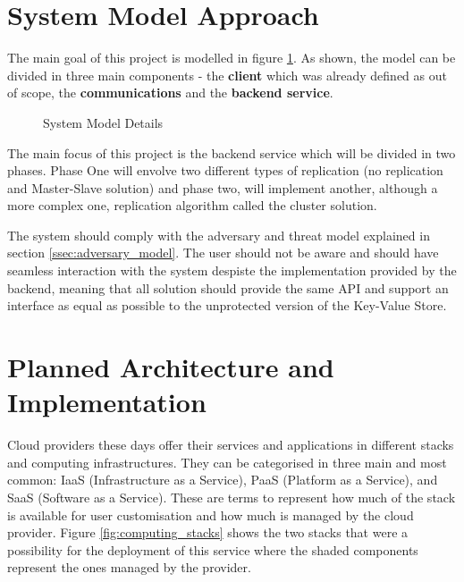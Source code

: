 \section{System Model Approach} %
\label{sec:system_model_approach}

The main goal of this project is modelled in figure \ref{fig:syste_model_detailed}. As shown, the model can be divided in three main components - the \textbf{client} which was already defined as out of scope, the \textbf{communications} and the \textbf{backend service}. 

\begin{figure}[htbp]
  \caption{System Model Details}
  \label{fig:syste_model_detailed}
\end{figure}

The main focus of this project is the backend service which will be divided in two phases. Phase One will envolve two different types of replication (no replication and Master-Slave solution) and phase two, will implement another, although a more complex one, replication algorithm called the cluster solution.

The system should comply with the adversary and threat model explained in section \ref{ssec:adversary_model}. The user should not be aware and should have seamless interaction with the system despiste the implementation provided by the backend, meaning that all solution should provide the same \gls{API} and support an interface as equal as possible to the unprotected version of the Key-Value Store.

\section{Planned Architecture and Implementation} %
\label{sec:planned_architecture_and_implementation}

Cloud providers these days offer their services and applications in different stacks and computing infrastructures. They can be categorised in three main and most common: \gls{IaaS} (Infrastructure as a Service), \gls{PaaS} (Platform as a Service), and \gls{SaaS} (Software as a Service). These are terms to represent how much of the stack is available for user customisation and how much is managed by the cloud provider. Figure \ref{fig:computing_stacks} shows the two stacks that were a possibility for the deployment of this service where the shaded components represent the ones managed by the provider.

